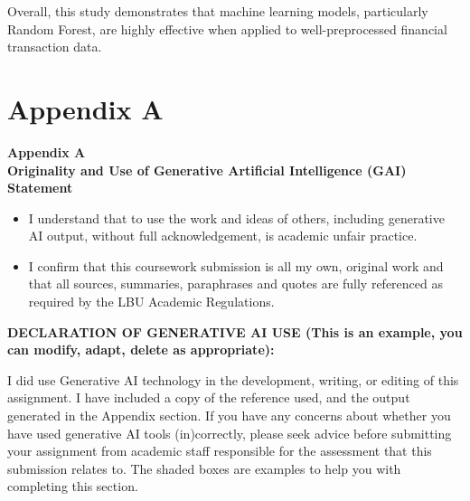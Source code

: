 \documentclass{article}
\begin{document}
Overall, this study demonstrates that machine learning models, particularly Random Forest, are highly effective when applied to well-preprocessed financial transaction data.





\clearpage
\section*{Appendix A}

\begin{center}
    {\Large \textbf{Appendix A}}\\[0.5cm]
    {\large \textbf{Originality and Use of Generative Artificial Intelligence (GAI) Statement}}
\end{center}

\vspace{0.5cm}

\begin{itemize}
    \item I understand that to use the work and ideas of others, including generative AI output, without full acknowledgement, is academic unfair practice.

    \item I confirm that this coursework submission is all my own, original work and that all sources, summaries, paraphrases and quotes are fully referenced as required by the LBU Academic Regulations.
\end{itemize}

\vspace{0.5cm}

\textbf{DECLARATION OF GENERATIVE AI USE (This is an example, you can modify, adapt, delete as appropriate):}

\vspace{0.3cm}

I did use Generative AI technology in the development, writing, or editing of this assignment. I have included a copy of the reference used, and the output generated in the Appendix section. If you have any concerns about whether you have used generative AI tools (in)correctly, please seek advice before submitting your assignment from academic staff responsible for the assessment that this submission relates to. The shaded boxes are examples to help you with completing this section.
\end{document}
